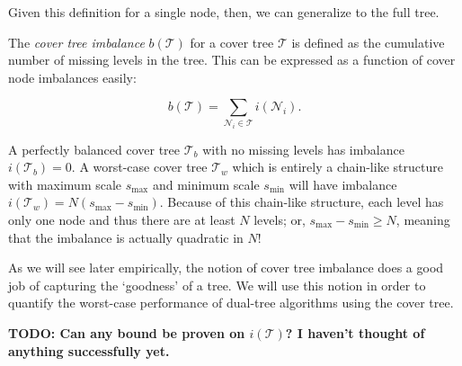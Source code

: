Given this definition for a single node, then, we can generalize to the full
tree.

\begin{defn}
The {\it cover tree imbalance} $b(\mathscr{T})$ for a cover tree $\mathscr{T}$
is defined as the cumulative number of missing levels in the tree.  This can be
expressed as a function of cover node imbalances easily:

\begin{equation}
b(\mathscr{T}) = \sum_{\mathscr{N}_i \in \mathscr{T}} i(\mathscr{N}_i).
\end{equation}
\end{defn}

A perfectly balanced cover tree $\mathscr{T}_b$ with no missing levels has
imbalance $i(\mathscr{T}_b) = 0$.  A worst-case cover tree $\mathscr{T}_w$ which
is entirely a chain-like structure with maximum scale $s_{\max}$ and minimum
scale $s_{\min}$ will have imbalance $i(\mathscr{T}_w) = N (s_{\max} -
s_{\min})$.  Because of this chain-like structure, each level has only one node
and thus there are at least $N$ levels; or, $s_{\max} - s_{\min} \ge N$, meaning
that the imbalance is actually quadratic in $N$!

As we will see later empirically, the notion of cover tree imbalance does a good
job of capturing the `goodness' of a tree.  We will use this notion in order to
quantify the worst-case performance of dual-tree algorithms using the cover
tree.

{\bf TODO: Can any bound be proven on $i(\mathscr{T})$?  I haven't thought of
anything successfully yet.}
